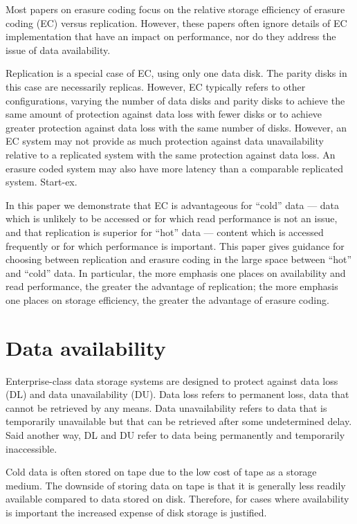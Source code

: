 \documentclass[11pt]{article}
\begin{document}
Most papers on erasure coding focus on the relative storage efficiency of erasure coding (EC) versus replication. However, these papers often ignore details of EC implementation that have an impact on performance, nor do they address the issue of data availability. 

Replication is a special case of EC, using only one data disk. The parity disks in this case are necessarily replicas. However, EC typically refers to other configurations, varying the number of data disks and parity disks to achieve the same amount of protection against data loss with fewer disks or to achieve greater protection against data loss with the same number of disks. However, an EC system may not provide as much protection against data unavailability relative to a replicated system with the same protection against data loss. An erasure coded system may also have more latency than a comparable replicated system. Start-ex.








In this paper we demonstrate that EC is advantageous for ``cold'' data --- data which is unlikely to be accessed or for which read performance is not an issue, and that replication is superior for ``hot'' data --- content which is accessed frequently or for which performance is important. This paper gives guidance for choosing between replication and erasure coding in the large space between ``hot'' and ``cold'' data. In particular, the more emphasis one places on availability and read performance, the greater the advantage of replication; the more emphasis one places on storage efficiency, the greater the advantage of erasure coding. 

\section{Data availability}

Enterprise-class data storage systems are designed to protect against data loss (DL) and data unavailability (DU). Data loss refers to permanent loss, data that cannot be retrieved by any means. Data unavailability refers to data that is temporarily unavailable but that can be retrieved after some undetermined delay. Said another way, DL and DU refer to data being permanently and temporarily inaccessible.

Cold data is often stored on tape due to the low cost of tape as a storage medium. The downside of storing data on tape is that it is generally less readily available compared to data stored on disk. Therefore, for cases where availability is important the increased expense of disk storage is justified. 
\end{document}
